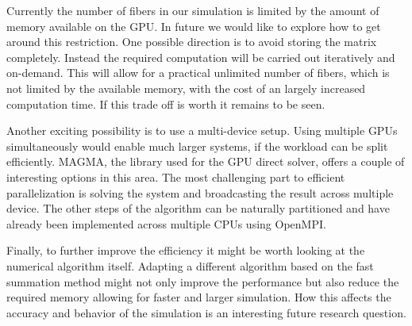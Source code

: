 Currently the number of fibers in our simulation is limited by the amount of memory available on the GPU. In future we would like to explore how to get around this restriction. One possible direction is to avoid storing the matrix completely. Instead the required computation will be carried out iteratively and on-demand. This will allow for a practical unlimited number of fibers, which is not limited by the available memory, with the cost of an largely increased computation time. If this trade off is worth it remains to be seen.

Another exciting possibility is to use a multi-device setup. Using multiple GPUs simultaneously would enable much larger systems, if the workload can be split efficiently. MAGMA, the library used for the GPU direct solver, offers a couple of interesting options in this area. The most challenging part to efficient parallelization is solving the system and broadcasting the result across multiple device. The other steps of the algorithm can be naturally partitioned and have already been implemented across multiple CPUs using OpenMPI.

Finally, to further improve the efficiency it might be worth looking at the numerical algorithm itself. Adapting a different algorithm based on the fast summation method might not only improve the performance but also reduce the required memory allowing for faster and larger simulation. How this affects the accuracy and behavior of the simulation is an interesting future research question.
